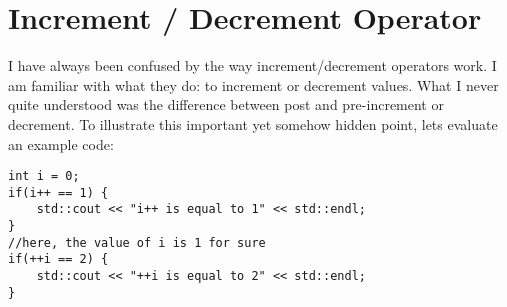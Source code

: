 \chapter{Increment / Decrement Operator}
I have always been confused by the way increment/decrement operators work. I am familiar with what they do: to increment or decrement values. What I never quite understood was the difference between post and pre-increment or decrement.
To illustrate this important yet somehow hidden point, lets evaluate an example code:

\begin{lstlisting}
int i = 0;
if(i++ == 1) {
	std::cout << "i++ is equal to 1" << std::endl;
}
//here, the value of i is 1 for sure
if(++i == 2) {
	std::cout << "++i is equal to 2" << std::endl;
}
\end{lstlisting}